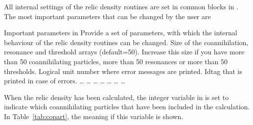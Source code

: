 All internal settings of the relic density routines are set in common
blocks in . The most important parameters that can be
changed by the user are

\begin{sub}{Important parameters in }
   Provide a set of parameters, with which the internal
  behaviour of the relic density routines can be changed.
   Size of the coannihilation, resonance and threshold
    arrays (default=50). Increase this size if you have more than 50
    coannihilating particles, more than 50 resonances or more than 50
    thresholds.
   Logical unit number where error messages are
    printed.
   Idtag that is printed in case of errors.
   \ldots
   \ldots
   \ldots
   \ldots
   \ldots
   \ldots
   \ldots
\end{sub}

When the relic density has been calculated, the integer variable  in  is set to indicate which coannihilating particles that have been included in the calculation. In Table~\ref{tab:copart}, the meaning if this variable is shown.

